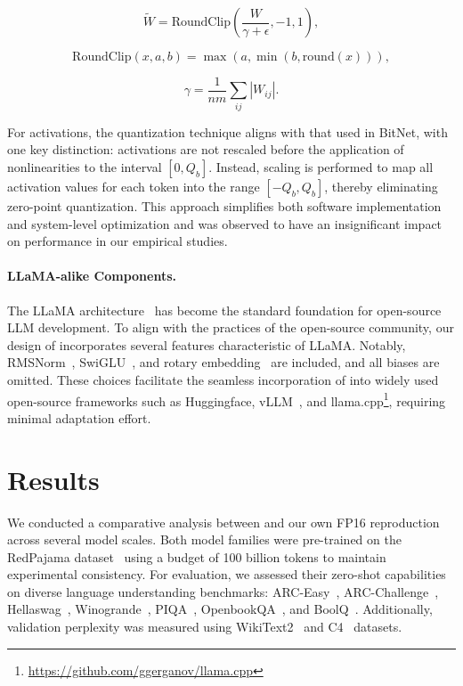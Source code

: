 \begin{equation}
    \widetilde{W} = \mathrm{RoundClip}(\frac{W}{\gamma + \epsilon}, -1, 1),
\end{equation}

\begin{equation}
    \mathrm{RoundClip}(x, a, b) = \max(a, \min(b, \mathrm{round}(x))),
\end{equation}

\begin{equation}
    \gamma = \frac{1}{nm}\sum_{ij} |W_{ij}|.
\end{equation}

For activations, the quantization technique aligns with that used in BitNet, with one key distinction: activations are not rescaled before the application of nonlinearities to the interval $[0, Q_b]$. Instead, scaling is performed to map all activation values for each token into the range $[-Q_b, Q_b]$, thereby eliminating zero-point quantization. This approach simplifies both software implementation and system-level optimization and was observed to have an insignificant impact on performance in our empirical studies.

\paragraph{LLaMA-alike Components.}

The LLaMA architecture~\cite{llama, llama2} has become the standard foundation for open-source LLM development. To align with the practices of the open-source community, our design of  incorporates several features characteristic of LLaMA. Notably, RMSNorm~\cite{rmsnorm}, SwiGLU~\cite{swiglu}, and rotary embedding~\cite{rope} are included, and all biases are omitted. These choices facilitate the seamless incorporation of  into widely used open-source frameworks such as Huggingface, vLLM~\cite{vllm}, and llama.cpp\footnote{\url{https://github.com/ggerganov/llama.cpp}}, requiring minimal adaptation effort.

\section{Results}

We conducted a comparative analysis between  and our own FP16  reproduction across several model scales. Both model families were pre-trained on the RedPajama dataset~\cite{redpajama} using a budget of 100 billion tokens to maintain experimental consistency. For evaluation, we assessed their zero-shot capabilities on diverse language understanding benchmarks: ARC-Easy~\cite{arc}, ARC-Challenge~\cite{arc}, Hellaswag~\cite{hellaswag}, Winogrande~\cite{winoGrande}, PIQA~\cite{piqa}, OpenbookQA~\cite{openbookqa}, and BoolQ~\cite{boolq}. Additionally, validation perplexity was measured using WikiText2~\cite{wikitext2} and C4~\cite{c4} datasets.

